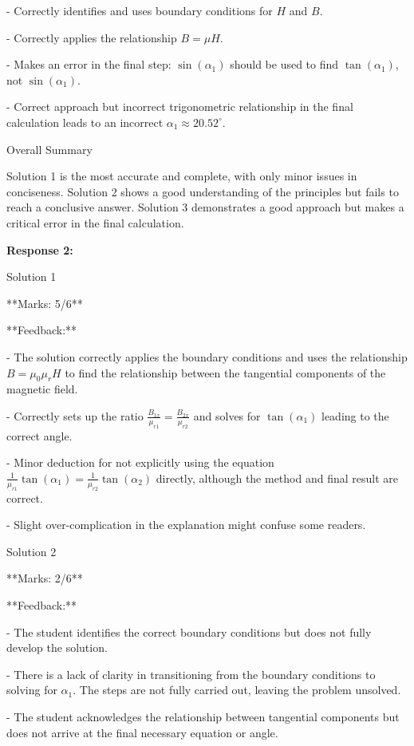 \documentclass[a4paper,11pt]{article}
\begin{document}
- Correctly identifies and uses boundary conditions for \(H\) and \(B\).

- Correctly applies the relationship \(B = \mu H\).

- Makes an error in the final step: \(\sin(\alpha_{1})\) should be used to find \(\tan(\alpha_{1})\), not \(\sin(\alpha_{1})\).

- Correct approach but incorrect trigonometric relationship in the final calculation leads to an incorrect \(\alpha_{1} \approx 20.52^\circ\).

Overall Summary

Solution 1 is the most accurate and complete, with only minor issues in conciseness. Solution 2 shows a good understanding of the principles but fails to reach a conclusive answer. Solution 3 demonstrates a good approach but makes a critical error in the final calculation.

\bigskip
\textbf{Response 2:}

Solution 1

**Marks: 5/6**

**Feedback:**  

- The solution correctly applies the boundary conditions and uses the relationship \( B = \mu_0 \mu_r H \) to find the relationship between the tangential components of the magnetic field.

- Correctly sets up the ratio \( \frac{B_{1x}}{\mu_{r1}} = \frac{B_{2x}}{\mu_{r2}} \) and solves for \(\tan(\alpha_1)\) leading to the correct angle.

- Minor deduction for not explicitly using the equation \( \frac{1}{\mu_{r1}} \tan(\alpha_1) = \frac{1}{\mu_{r2}} \tan(\alpha_2) \) directly, although the method and final result are correct.

- Slight over-complication in the explanation might confuse some readers.

Solution 2

**Marks: 2/6**

**Feedback:**

- The student identifies the correct boundary conditions but does not fully develop the solution.

- There is a lack of clarity in transitioning from the boundary conditions to solving for \(\alpha_1\). The steps are not fully carried out, leaving the problem unsolved.

- The student acknowledges the relationship between tangential components but does not arrive at the final necessary equation or angle.
\end{document}
